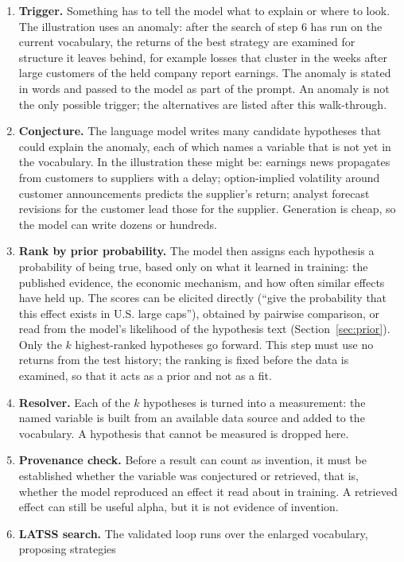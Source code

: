 \documentclass[11pt]{article}
\begin{document}
\begin{enumerate}[leftmargin=1.6em]
\item \textbf{Trigger.} Something has to tell the model what to explain or where to look. The
illustration uses an anomaly: after the search of step 6 has run on the current vocabulary, the returns of
the best strategy are examined for structure it leaves behind, for example losses that cluster in the
weeks after large customers of the held company report earnings. The anomaly is stated in words and passed
to the model as part of the prompt. An anomaly is not the only possible trigger; the alternatives are
listed after this walk-through.
\item \textbf{Conjecture.} The language model writes many candidate hypotheses that could explain the
anomaly, each of which names a variable that is not yet in the vocabulary. In the illustration these
might be: earnings news propagates from customers to suppliers with a delay; option-implied volatility
around customer announcements predicts the supplier's return; analyst forecast revisions for the
customer lead those for the supplier. Generation is cheap, so the model can write dozens or hundreds.
\item \textbf{Rank by prior probability.} The model then assigns each hypothesis a probability of being
true, based only on what it learned in training: the published evidence, the economic mechanism, and how
often similar effects have held up. The scores can be elicited directly (``give the probability that
this effect exists in U.S. large caps''), obtained by pairwise comparison, or read from the model's
likelihood of the hypothesis text (Section~\ref{sec:prior}). Only the $k$ highest-ranked hypotheses go
forward. This step must use no returns from the test history; the ranking is fixed before the data is
examined, so that it acts as a prior and not as a fit.
\item \textbf{Resolver.} Each of the $k$ hypotheses is turned into a measurement: the named variable is
built from an available data source and added to the vocabulary. A hypothesis that cannot be measured is
dropped here.
\item \textbf{Provenance check.} Before a result can count as invention, it must be established whether
the variable was conjectured or retrieved, that is, whether the model reproduced an effect it read about
in training. A retrieved effect can still be useful alpha, but it is not evidence of invention.
\item \textbf{LATSS search.} The validated loop runs over the enlarged vocabulary, proposing strategies

\end{enumerate}
\end{document}
